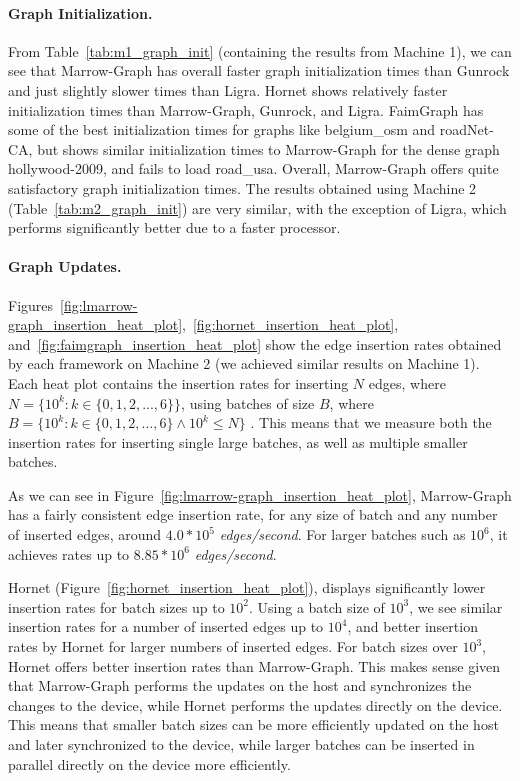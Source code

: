 \paragraph{\textbf{Graph Initialization}.} From Table~\ref{tab:m1_graph_init} (containing the results from Machine 1), we can see that Marrow-Graph has overall faster graph initialization times than Gunrock and just slightly slower times than Ligra. Hornet shows relatively faster initialization times than Marrow-Graph, Gunrock, and Ligra. FaimGraph has some of the best initialization times for graphs like belgium\_osm and roadNet-CA, but shows similar initialization times to Marrow-Graph for the dense graph hollywood-2009, and fails to load road\_usa. Overall, Marrow-Graph offers quite satisfactory graph initialization times. The results obtained using Machine 2 (Table~\ref{tab:m2_graph_init}) are very similar, with the exception of Ligra, which performs significantly better due to a faster processor.



\paragraph{\textbf{Graph Updates}.} Figures~\ref{fig:lmarrow-graph_insertion_heat_plot},~\ref{fig:hornet_insertion_heat_plot}, and~\ref{fig:faimgraph_insertion_heat_plot} show the edge insertion rates obtained by each framework on Machine 2 (we achieved similar results on Machine 1). Each heat plot contains the insertion rates for inserting $N$ edges, where $N = \{10^k : k \in \{0,1,2,...,6\}\}$, using batches of size $B$, where $B = \{10^k : k \in \{0,1,2,\ldots,6\} \land 10^k \leq N\}$
. This means that we measure both the insertion rates for inserting single large batches, as well as multiple smaller batches. 

As we can see in Figure~\ref{fig:lmarrow-graph_insertion_heat_plot}, Marrow-Graph has a fairly consistent edge insertion rate, for any size of batch and any number of inserted edges, around $4.0 * 10^5$ \textit{edges/second}. For larger batches such as $10^6$, it achieves rates up to $8.85 * 10^6$ \textit{edges/second}. 

Hornet (Figure~\ref{fig:hornet_insertion_heat_plot}), displays significantly lower insertion rates for batch sizes up to $10^2$. Using a batch size of $10^3$, we see similar insertion rates for a number of inserted edges up to $10^4$, and better insertion rates by Hornet for larger numbers of inserted edges. For batch sizes over $10^3$, Hornet offers better insertion rates than Marrow-Graph. This makes sense given that Marrow-Graph performs the updates on the host and synchronizes the changes to the device, while Hornet performs the updates directly on the device. This means that smaller batch sizes can be more efficiently updated on the host and later synchronized to the device, while larger batches can be inserted in parallel directly on the device more efficiently.

